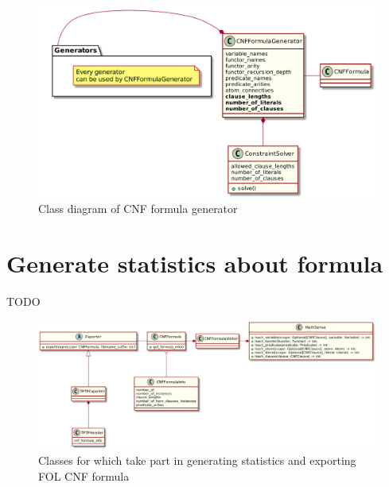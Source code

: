 \begin{figure}[h]
\begin{centering}
  \includegraphics[width=\textwidth]{logic-formula-generator/cnf_formula_generator.png}
  \caption{Class diagram of CNF formula generator}
  \label{pic:cnf_generator_class_diagram}
\end{centering}
\end{figure}

\section{Generate statistics about formula}
\label{sec:GenerateStatisticsAboutFormula}

TODO

\begin{figure}[h]
\begin{centering}
  \includegraphics[width=\textwidth]{logic-formula-generator/fol/cnf_formula_statistics.png}
  \caption{Classes for which take part in generating statistics and exporting FOL CNF formula}
  \label{pic:}
\end{centering}
\end{figure}
